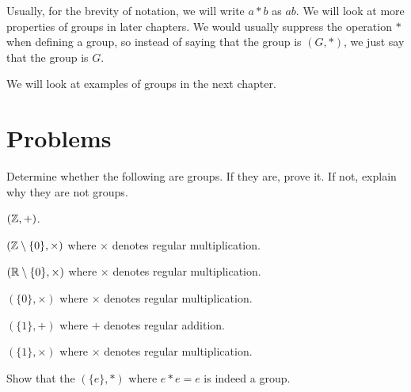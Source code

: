 Usually, for the brevity of notation, we will write $a \ast b$ as $ab$. We will look at more properties of groups in later chapters. We would usually suppress the operation $\ast$ when defining a group, so instead of saying that the group is $(G, \ast)$, we just say that the group is $G$.

We will look at examples of groups in the next chapter.

\newpage

\section{Problems}
\begin{problem}
Determine whether the following are groups. If they are, prove it. If not, explain why they are not groups.
\begin{partquestions}{\alph*}
    \item $(\mathbb{Z}, +)$.
    \item $(\mathbb{Z} \setminus \{0\}, \times)$ where $\times$ denotes regular multiplication.
    \item $(\mathbb{R} \setminus \{0\}, \times)$ where $\times$ denotes regular multiplication.
    \item $(\{0\}, \times)$ where $\times$ denotes regular multiplication.
    \item $(\{1\}, +)$ where $+$ denotes regular addition.
    \item $(\{1\}, \times)$ where $\times$ denotes regular multiplication.
\end{partquestions}
\end{problem}

\begin{problem}
    Show that the  $(\{e\}, *)$ where $e \ast e = e$ is indeed a group.
\end{problem}

